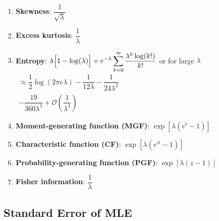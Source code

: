 \begin{enumerate}

    \item \textbf{Skewness}:
    $
         {\displaystyle {\dfrac {1}{\sqrt {\lambda }}}}
    $
    \hfill \cite{wiki/Poisson_distribution}

    \item \textbf{Excess kurtosis}:
    $
         {\displaystyle {\dfrac {1}{\lambda }}}
    $
    \hfill \cite{wiki/Poisson_distribution}

    \item \textbf{Entropy}:
    ${\displaystyle \lambda {\Bigl [}1-\log(\lambda ){\Bigr ]}+e^{-\lambda }\sum _{k=0}^{\infty }{\dfrac {\lambda ^{k}\log(k!)}{k!}}}$
    or for large ${\displaystyle \lambda }$
    ${\displaystyle {\begin{aligned}\approx {\dfrac {1}{2}}\log \left(2\pi e\lambda \right)-{\dfrac {1}{12\lambda }}-{\dfrac {1}{24\lambda ^{2}}}\\-{\dfrac {19}{360\lambda ^{3}}}+{\mathcal {O}}\left({\dfrac {1}{\lambda ^{4}}}\right)\end{aligned}}}$
    \hfill \cite{wiki/Poisson_distribution}

    \item \textbf{Moment-generating function (MGF)}:
    $
         {\displaystyle \exp \left[\lambda \left(e^{t}-1\right)\right]}
    $
    \hfill \cite{wiki/Poisson_distribution}

    \item \textbf{Characteristic function (CF)}:
    $
         {\displaystyle \exp \left[\lambda \left(e^{it}-1\right)\right]}
    $
    \hfill \cite{wiki/Poisson_distribution}

    \item \textbf{Probability-generating function (PGF)}:
    $
         {\displaystyle \exp \left[\lambda \left(z-1\right)\right]}
    $
    \hfill \cite{wiki/Poisson_distribution}

    \item \textbf{Fisher information}:
    $
         {\displaystyle {\dfrac {1}{\lambda }}}
    $
    \hfill \cite{wiki/Poisson_distribution}
\end{enumerate}




\subsection{Standard Error of MLE}

